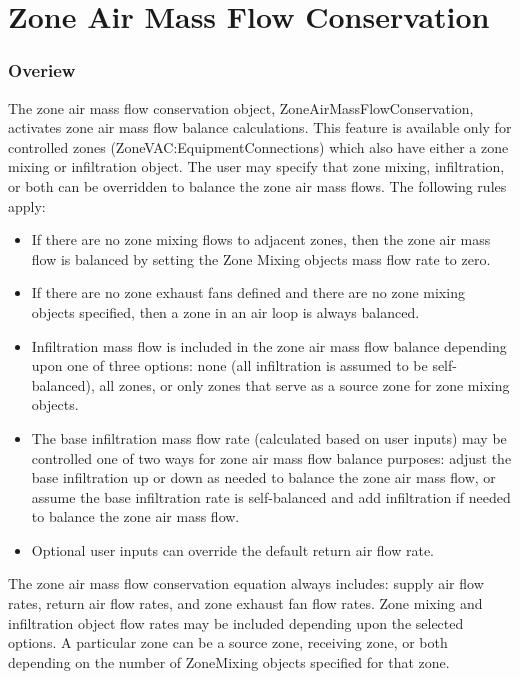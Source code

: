 \section{Zone Air Mass Flow Conservation}\label{zone-air-mass-flow-conservation}

\subsubsection{Overiew}\label{overiew}

The zone air mass flow conservation object, ZoneAirMassFlowConservation, activates zone air mass flow balance calculations. This feature is available only for controlled zones (ZoneVAC:EquipmentConnections) which also have either a zone mixing or infiltration object. The user may specify that zone mixing, infiltration, or both can be overridden to balance the zone air mass flows. The following rules apply:

\begin{itemize}
\tightlist
\item
  If there are no zone mixing flows to adjacent zones, then the zone air mass flow is balanced by setting the Zone Mixing objects mass flow rate to zero.
\item
  If there are no zone exhaust fans defined and there are no zone mixing objects specified, then a zone in an air loop is always balanced.
\item
  Infiltration mass flow is included in the zone air mass flow balance depending upon one of three options: none (all infiltration is assumed to be self-balanced), all zones, or only zones that serve as a source zone for zone mixing objects.
\item
  The base infiltration mass flow rate (calculated based on user inputs) may be controlled one of two ways for zone air mass flow balance purposes: adjust the base infiltration up or down as needed to balance the zone air mass flow, or assume the base infiltration rate is self-balanced and add infiltration if needed to balance the zone air mass flow.
\item
  Optional user inputs can override the default return air flow rate.
\end{itemize}

The zone air mass flow conservation equation always includes: supply air flow rates, return air flow rates, and zone exhaust fan flow rates. Zone mixing and infiltration object flow rates may be included depending upon the selected options. A particular zone can be a source zone, receiving zone, or both depending on the number of ZoneMixing objects specified for that zone.

